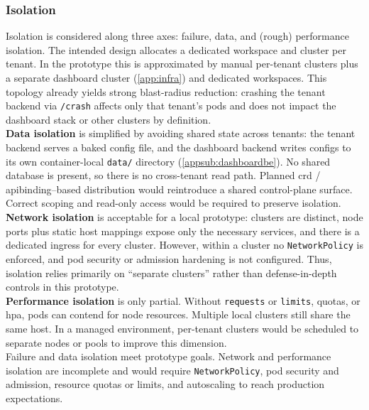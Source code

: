 \documentclass[11pt, a4paper, oneside, listof=totoc]{scrartcl}
\begin{document}
            \subsubsection{Isolation}\label{subsubsec:evalIsolation}
                Isolation is considered along three axes: failure, data, and (rough) performance
                isolation.
                The intended design allocates a dedicated workspace and cluster per tenant.
                In the prototype this is approximated by manual per-tenant clusters plus a separate
                dashboard cluster (\autoref{app:infra}) and dedicated workspaces.
                This topology already yields strong blast-radius reduction: crashing the tenant
                backend via \texttt{/crash} affects only that tenant’s pods and does not impact the
                dashboard stack or other clusters by definition.\\
                \textbf{Data isolation} is simplified by avoiding shared state across tenants: the
                tenant backend serves a baked config file, and the dashboard backend writes configs
                to its own container-local \texttt{data/} directory (\autoref{appsub:dashboardbe}).
                No shared database is present, so there is no cross-tenant read path.
                Planned \gls{crd} / \gls{apibinding}–based distribution would reintroduce a shared
                control-plane surface.
                Correct scoping and read-only access would be required to preserve isolation.\\
                \textbf{Network isolation} is acceptable for a local prototype: clusters are
                distinct, node ports plus static host mappings expose only the necessary services,
                and there is a dedicated \gls{ingress} for every cluster.
                However, within a cluster no \texttt{NetworkPolicy} is enforced, and pod security
                or admission hardening is not configured.
                Thus, isolation relies primarily on \enquote{separate clusters} rather than defense-in-depth
                controls in this prototype.\\
                \textbf{Performance isolation} is only partial.
                Without \texttt{requests} or \texttt{limits}, quotas, or \gls{hpa}, pods can contend
                for node resources.
                Multiple local clusters still share the same host.
                In a managed environment, per-tenant clusters would be scheduled to separate
                nodes or pools to improve this dimension.\\
                Failure and data isolation meet prototype goals.
                Network and performance isolation are incomplete and would require
                \texttt{NetworkPolicy}, pod security and admission, resource quotas or limits, and
                autoscaling to reach production expectations.
\end{document}
